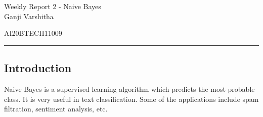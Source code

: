 \documentclass[12pt,letterpaper, onecolumn]{exam}
\begin{document}
\newtheorem{theorem}{Theorem}[section]
\newtheorem{problem}{Problem}
\newtheorem{proposition}{Proposition}[section]
\newtheorem{lemma}{Lemma}[section]
\newtheorem{corollary}[theorem]{Corollary}
\newtheorem{example}{Example}[section]
\newtheorem{definition}[problem]{Definition}

\newcommand{\BEQA}{\begin{eqnarray}}
\newcommand{\EEQA}{\end{eqnarray}}
\newcommand{\define}{\stackrel{\triangle}{=}}

\raggedbottom
\setlength{\parindent}{0pt}
\providecommand{\mbf}{\mathbf}
\providecommand{\norm}[1]{\lVert#1\rVert}
\providecommand{\pr}[1]{\ensuremath{\Pr\left(#1\right)}}
\providecommand{\qfunc}[1]{\ensuremath{Q\left(#1\right)}}
\providecommand{\sbrak}[1]{\ensuremath{{}\left[#1\right]}}
\providecommand{\lsbrak}[1]{\ensuremath{{}\left[#1\right.}}
\providecommand{\rsbrak}[1]{\ensuremath{{}\left.#1\right]}}
\providecommand{\brak}[1]{\ensuremath{\left(#1\right)}}
\providecommand{\lbrak}[1]{\ensuremath{\left(#1\right.}}
\providecommand{\rbrak}[1]{\ensuremath{\left.#1\right)}}
\providecommand{\cbrak}[1]{\ensuremath{\left\{#1\right\}}}
\providecommand{\lcbrak}[1]{\ensuremath{\left\{#1\right.}}
\providecommand{\rcbrak}[1]{\ensuremath{\left.#1\right\}}}
\let\vec\mathbf




\begingroup  
    \centering
    
    \LARGE Weekly Report 2 - Naive Bayes\\[0.5em]
    
    \large Ganji Varshitha\par
    \large AI20BTECH11009\par
\endgroup
\rule{\textwidth}{0.4pt}
\pointsdroppedatright   %
\printanswers
\newcommand\Solution{
  \textbf{Solution:}\\}
\newcommand{\myvec}[1]{\ensuremath{\begin{bmatrix}#1\end{bmatrix}}}

 \subsection*{Introduction}
Naive Bayes is a supervised learning algorithm which predicts the most probable class. It is very useful in text classification. Some of the applications include spam filtration, sentiment analysis, etc.
\end{document}

